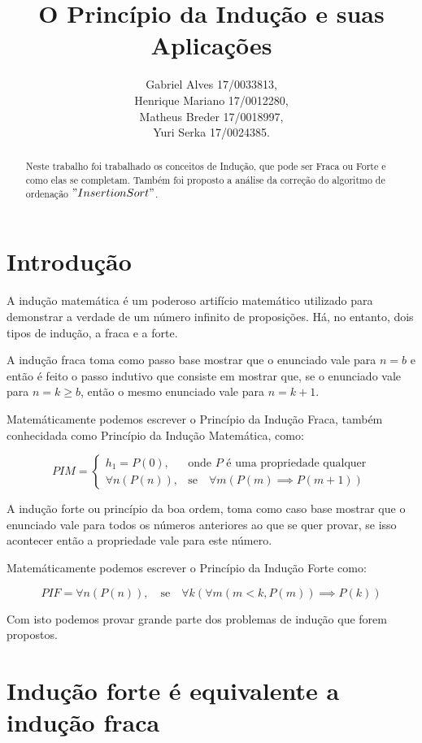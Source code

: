 \documentclass[a4paper, 10pt]{article}
\title{\LARGE \bf
O Princípio da Indução e suas Aplicações
}
\author{Gabriel Alves 17/0033813, \\
        Henrique Mariano 17/0012280, \\
        Matheus Breder 17/0018997, \\
        Yuri Serka 17/0024385.}
\begin{document}
\maketitle

\begin{abstract}

Neste trabalho foi trabalhado os conceitos de Indução, que pode ser Fraca ou Forte e como elas se completam. Também foi proposto a análise da correção do algoritmo de ordenação $"Insertion Sort"$.

\end{abstract}

\section{Introdução}

A indução matemática é um poderoso artifício matemático utilizado para demonstrar a verdade de um número infinito de proposições. Há, no entanto, dois tipos de indução, a fraca e a forte.

A indução fraca toma como passo base mostrar que o enunciado vale para $n = b$ e então é feito o passo indutivo que consiste em mostrar que, se o enunciado vale para $n = k \geq{b} $, então o mesmo enunciado vale para $n = k + 1$.

Matemáticamente podemos escrever o Princípio da Indução Fraca, também conhecidada como Princípio da Indução Matemática, como:

$$
PIM = \begin{cases}
h_1 = P(0), &\mbox{onde } P\mbox{ é uma propriedade qualquer}\\
\forall{n}(P(n)), &\mbox{se}\quad \forall{m}(P(m) \implies P(m+1))
\end{cases}
$$

A indução forte ou princípio da boa ordem, toma como caso base mostrar que o enunciado vale para todos os números anteriores ao que se quer provar, se isso acontecer então a propriedade vale para este número.

Matemáticamente podemos escrever o Princípio da Indução Forte como:

$$
PIF = \forall{n}(P(n)), \quad\mbox{se}\quad\forall{k}(\forall{m}(m < k, P(m)) \implies P(k))
$$

Com isto podemos provar grande parte dos problemas de indução que forem propostos.

\section{Indução forte é equivalente a indução fraca}
\label{sec:inducao}
\end{document}
